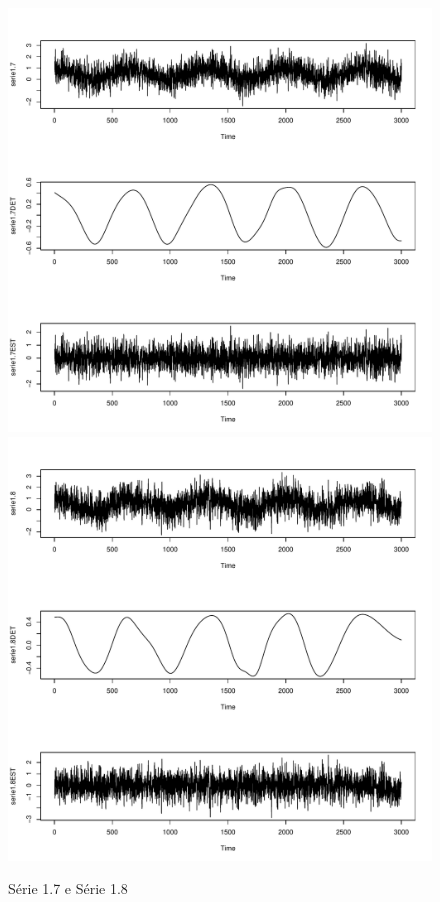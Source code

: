 \graphicspath{{imagens/}}
\begin{figure}[H]
\begin{center}
  \includegraphics[scale=0.43]{serie1_7.pdf} \quad
  \includegraphics[scale=0.43]{serie1_8.pdf}
  \caption{Série 1.7 e Série 1.8}

\end{center}
\end{figure}

